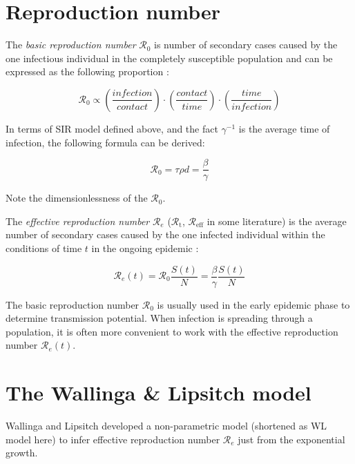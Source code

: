 \documentclass[
  digital, %
  oneside, %
  lof,     %
  lot,     %
]{fithesis4}
\begin{document}
\section{Reproduction number}

The \textit{basic reproduction number} $\mathcal{R}_0$ is number 
of secondary cases caused by the one infectious individual 
in the completely susceptible population and can be expressed
as the following proportion \cite{jones2007}:

\begin{equation}
	\mathcal{R}_0 \propto \left(\frac{infection}{contact}\right)\cdot\left(\frac{contact}{time}\right)\cdot\left(\frac{time}{infection}\right)  
\end{equation}

In terms of SIR model defined above, and the fact $\gamma^{-1}$ is 
the average time of infection, the following formula can be derived:

\begin{equation}
	\mathcal{R}_0 = \tau \rho d = \frac{\beta}{\gamma}
\end{equation}

Note the dimensionlessness of the $\mathcal{R}_0$.

The \textit{effective reproduction number} $\mathcal{R}_e$ 
($\mathcal{R}_{\text{t}}$, $\mathcal{R}_{\text{eff}}$ in 
some literature) is the average number of secondary cases 
caused by the one infected individual within the 
conditions of time $t$ in the ongoing epidemic \cite{chowell2016}:

\begin{equation}
	\mathcal{R}_e(t) = \mathcal{R}_0 \frac{S(t)}{N} = \frac{\beta}{\gamma} \frac{S(t)}{N}
\end{equation}

The basic reproduction number $\mathcal{R}_0$ is usually used
in the early epidemic phase to determine transmission potential.
When infection is
spreading through a population, it is often more convenient
to work with the effective reproduction number $\mathcal{R}_e(t)$.

\section{The Wallinga \& Lipsitch model}

Wallinga and Lipsitch \cite{wallinga2007} developed a non-parametric
model (shortened as WL model here) to infer effective reproduction
number $\mathcal{R}_e$ just from the exponential growth.
\end{document}
